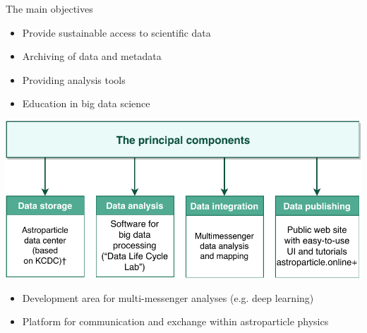 

\begin{frame}{The main objectives}
\begin{minipage}[c]{0.45\textwidth}
  \begin{itemize}
    \item  Provide sustainable access to scientific data
    \item  Archiving of data and metadata
    \item  Providing analysis tools
    \item  Education in big data science
  \end{itemize}
\end{minipage}
\hfill
\begin{minipage}[c]{0.54\textwidth}
  \includegraphics[width=1\textwidth]{pics/proj_objectives.pdf}
\end{minipage}
  \vspace{-\topsep}
  \vspace{-\partopsep}
  \vspace{\itemsep}
  \vspace{\parsep}
  \begin{itemize}
    \item  Development area for multi-messenger analyses (e.g. deep learning)
    \item  Platform for communication and exchange within astroparticle physics
  \end{itemize}
\end{frame}

